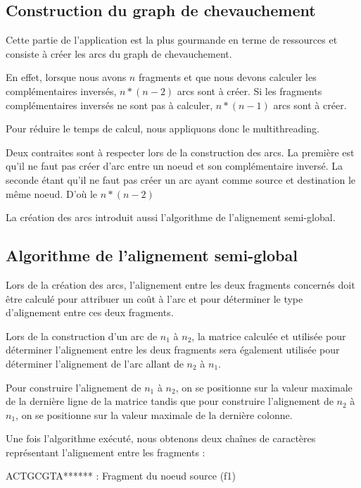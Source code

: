 \documentclass[12pt,a4paper,final]{article}
\begin{document}
\subsection{Construction du graph de chevauchement}

Cette partie de l'application est la plus gourmande en terme de ressources et consiste à créer les arcs du graph de chevauchement.\medskip

En effet, lorsque nous avons $n$ fragments et que nous devons calculer les complémentaires inversés, $n*(n-2)$ arcs sont à créer.  Si les fragments complémentaires inversés ne sont pas à calculer, $n*(n-1)$ arcs sont à créer.\medskip

Pour réduire le temps de calcul, nous appliquons donc le multithreading.\medskip

Deux contraites sont à respecter lors de la construction des arcs.  La première est qu'il ne faut pas créer d'arc entre un noeud et son complémentaire inversé.  La seconde étant qu'il ne faut pas créer un arc ayant comme source et destination le même noeud.  D'où le $n*(n-2)$\medskip

La création des arcs introduit aussi l'algorithme de l'alignement semi-global.\medskip

\subsection{Algorithme de l'alignement semi-global}

Lors de la création des arcs, l'alignement entre les deux fragments concernés doit être calculé pour attribuer un coût à l'arc et pour déterminer le type d'alignement entre ces deux fragments.\medskip

Lors de la construction d'un arc de $n_1$ à $n_2$, la matrice calculée et utilisée pour déterminer l'alignement entre les deux fragments sera également utilisée pour déterminer l'alignement de l'arc allant de $n_2$ à $n_1$.\medskip

Pour construire l'alignement de $n_1$ à $n_2$, on se positionne sur la valeur maximale de la dernière ligne de la matrice tandis que pour construire l'alignement de $n_2$ à $n_1$, on se positionne sur la valeur maximale de la dernière colonne.\medskip

Une fois l'algorithme exécuté, nous obtenons deux chaînes de caractères représentant l'alignement entre les fragments : \medskip

ACTGCGTA****** : Fragment du noeud source (f1)\medskip
\end{document}
